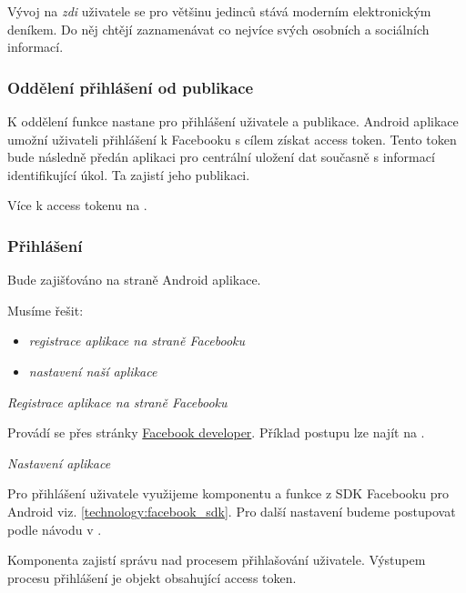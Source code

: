 \documentclass[thesis=B,czech]{FITthesis}[2012/06/26]
\begin{document}
Vývoj na \textit{zdi} uživatele se pro většinu jedinců stává moderním elektronickým deníkem. Do něj chtějí zaznamenávat co nejvíce svých osobních a sociálních informací.

\subsubsection{Oddělení přihlášení od publikace}
\label{design:facebook_divide_appliaction}
	
K oddělení funkce nastane pro přihlášení uživatele a publikace.
Android aplikace umožní uživateli přihlášení k Facebooku s cílem získat access token. Tento token bude následně předán aplikaci pro centrální uložení dat současně s informací identifikující úkol. Ta zajistí jeho publikaci.

Více k access tokenu na \cite{design_facebook_access_tokens}.

\subsubsection{Přihlášení}

Bude zajišťováno na straně Android aplikace.
\newline


Musíme řešit:
\begin{itemize}[nosep]
	\item \textit{registrace aplikace na straně Facebooku}
	\item \textit{nastavení naší aplikace}
\end{itemize}
\vspace*{1\baselineskip}

\textit{Registrace aplikace na straně Facebooku}

Provádí se přes stránky \href{''https://developers.facebook.com/''}{Facebook developer}\cite{design_facebook_developer}. Příklad postupu lze najít na \cite{design_facebook_registration_example}. 
\newline

\textit{Nastavení aplikace}

Pro přihlášení uživatele využijeme komponentu a funkce z SDK Facebooku pro Android viz. \ref{technology:facebook_sdk}. Pro další nastavení budeme postupovat podle návodu v \cite{design_facebook_android_login}.

Komponenta zajistí správu nad procesem přihlašování uživatele. Výstupem procesu přihlášení je objekt obsahující access token.
\end{document}
